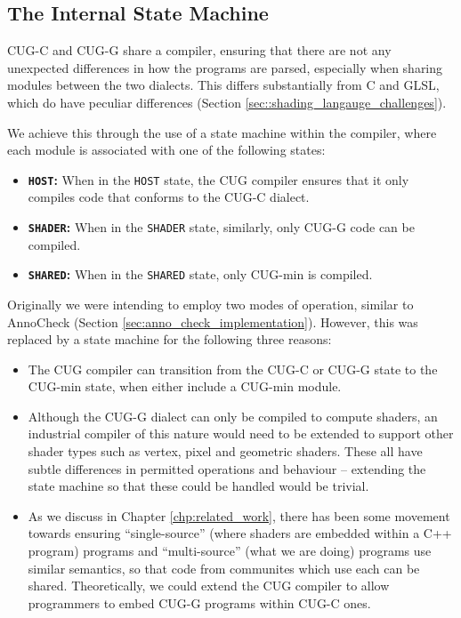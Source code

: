 \documentclass[a4paper,12pt,twoside,openright]{report}
\begin{document}
\subsection{The Internal State Machine}

\label{sec:internal_state_machine}

CUG-C and CUG-G share a compiler, ensuring that there are not any unexpected
differences in how the programs are parsed, especially when sharing modules
between the two dialects. This differs substantially from C and GLSL, which do
have peculiar differences (Section \ref{sec::shading_langauge_challenges}).

We achieve this through the use of a state machine within the compiler, where
each module is associated with one of the following states:

\begin{itemize}

    \item \textbf{\texttt{HOST}:} When in the \texttt{HOST} state, the CUG
    compiler ensures that it only compiles code that conforms to the CUG-C
    dialect.

    \item \textbf{\texttt{SHADER}:} When in the \texttt{SHADER} state,
    similarly, only CUG-G code can be compiled.

    \item \textbf{\texttt{SHARED}:} When in the \texttt{SHARED} state, only
    CUG-min is compiled.

\end{itemize}

Originally we were intending to employ two modes of operation, similar to
AnnoCheck (Section \ref{sec:anno_check_implementation}). However, this was
replaced by a state machine for the following three reasons:

\begin{itemize}

    \item The CUG compiler can transition from the CUG-C or CUG-G state to the
    CUG-min state, when either include a CUG-min module.

    \item Although the CUG-G dialect can only be compiled to compute shaders,
    an industrial compiler of this nature would need to be extended to support
    other shader types such as vertex, pixel and geometric shaders. These all
    have subtle differences in permitted operations and behaviour -- extending
    the state machine so that these could be handled would be trivial.

    \item As we discuss in Chapter \ref{chp:related_work}, there has been some
    movement towards ensuring ``single-source'' (where shaders are embedded
    within a C++ program) programs and ``multi-source'' (what we are doing)
    programs use similar semantics, so that code from communites which use each
    can be shared. Theoretically, we could extend the CUG compiler to allow
    programmers to embed CUG-G programs within CUG-C ones.

\end{itemize}
\end{document}
